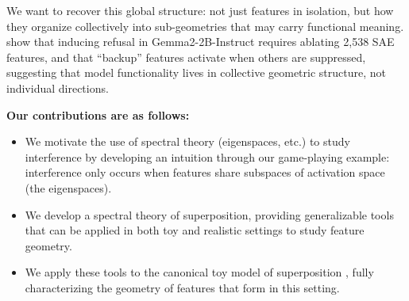 \documentclass{article}
\theoremstyle{plain}
\numberwithin{equation}{section}
\theoremstyle{definition}
\theoremstyle{remark}
\begin{document}
We want to recover this global structure: not just features in isolation, but how they organize collectively into sub-geometries that may carry functional meaning. \citet{higher_order_features} show that inducing refusal in Gemma2-2B-Instruct requires ablating 2,538 SAE features, and that ``backup'' features activate when others are suppressed, suggesting that model functionality lives in collective geometric structure, not individual directions.

\textbf{Our contributions are as follows:}
\begin{itemize}
    \item We motivate the use of spectral theory (eigenspaces, etc.) to study interference by developing an intuition through our game-playing example: interference only occurs when features share subspaces of activation space (the eigenspaces).
    \item We develop a spectral theory of superposition, providing generalizable tools that can be applied in both toy and realistic settings to study feature geometry.
    \item We apply these tools to the canonical toy model of superposition \citep{toymodels}, fully characterizing the geometry of features that form in this setting.
\end{itemize}



\end{document}
